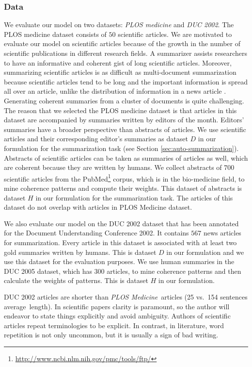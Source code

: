 \subsubsection{Data}
We evaluate our model on two datasets:  \emph{PLOS medicine} and \emph{DUC 2002}. 
The PLOS medicine dataset consists of $50$ scientific articles.  
We are motivated to evaluate our model on scientific articles because of the growth in the number of scientific publications in different research fields.  
A summarizer assists researchers to have an informative and coherent gist of long scientific articles. 
Moreover, summarizing scientific articles is as difficult as multi-document summarization because scientific articles tend to be long and the important information is spread all over an article,  unlike the distribution of information in a news article \cite{teufel02}. 
Generating coherent summaries from a cluster of documents is quite challenging. 
The reason that we selected the PLOS medicine dataset is that articles in this dataset are accompanied by summaries written by editors of the month. 
Editors' summaries have a broader perspective than abstracts of articles.  
We use scientific articles and their corresponding editor's summaries as dataset $D$ in our formulation for the summarization task (see Section \ref{sec:auto-summarization}). 
Abstracts of scientific articles can be taken as summaries of articles as well, which are coherent because they are written by humans. 
We collect abstracts of $700$ scientific articles from the PubMed\footnote{\url{http://www.ncbi.nlm.nih.gov/pmc/tools/ftp/}} corpus, which is in the \mbox{bio-medicine} field, to mine coherence patterns and compute their weights. 
This dataset of abstracts is dataset $H$ in our formulation for the summarization task.  
The articles of this dataset do not overlap with articles in PLOS Medicine dataset. 

We also evaluate our model on the DUC 2002 dataset that has been annotated for the Document Understanding Conference 2002. 
It contains $567$ news articles for summarization. 
Every article in this dataset is associated with at least two gold summaries written by humans. 
This is dataset $D$ in our formulation and we use this dataset for the evaluation purposes. 
We use human summaries in the DUC 2005 dataset, which has $300$ articles, to mine coherence patterns and then calculate the weights of patterns.  
This is dataset $H$ in our formulation. 

DUC 2002 articles are shorter than \emph{PLOS Medicine}\ articles (25 vs.\ 154 sentences average\ length). 
In scientific papers clarity is paramount, so the author will endeavor to state things explicitly and avoid ambiguity. 
Authors of scientific articles repeat terminologies to be explicit.     
In contrast, in literature, word repetition is not only uncommon, but it is usually a sign of bad writing. 

